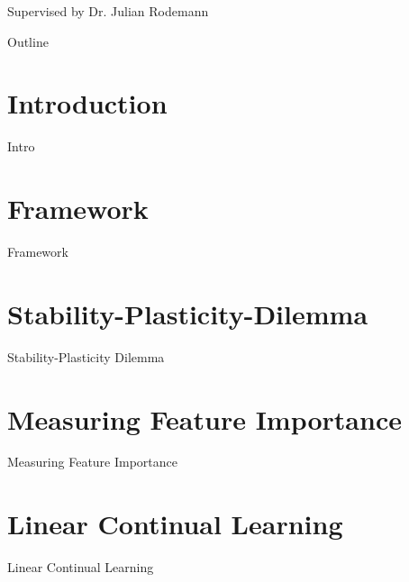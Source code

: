 \documentclass{beamer}
\title{\mytitle}
\author{Jörg Schantz}
\institute{Ludwig-Maximilian Universität München}
\date{April 4, 2025}
\newcommand{\mysupervisor}{Dr. Julian Rodemann}
\begin{document}
\begin{frame}
    \maketitle
    \centering
    Supervised by \mysupervisor
\end{frame}
\begin{frame}{Outline}
    \tableofcontents
\end{frame}

\section{Introduction}

\begin{frame}{Intro}

\end{frame}

\section{Framework}

\begin{frame}{Framework}
	
\end{frame}

\section{Stability-Plasticity-Dilemma}

\begin{frame}{Stability-Plasticity Dilemma}
	
\end{frame}

\section{Measuring Feature Importance}

\begin{frame}{Measuring Feature Importance}
	
\end{frame}

\section{Linear Continual Learning}

\begin{frame}{Linear Continual Learning}
	
\end{frame}
\end{document}
